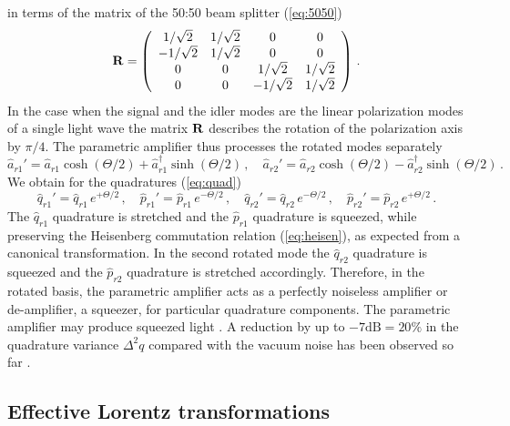 \documentclass[12pt,amsmath,amssymb]{article}
\def\underline#1{{\bf #1}}
\numberwithin{equation}{section}
\begin{document}
in terms of the matrix of the 50:50 beam splitter (\ref{eq:5050})
\begin{equation}
\underline{R} = \left(
    \begin{array}{cccc}
     {1}/{\sqrt{2}}&{1}/{\sqrt{2}}&0&0\\
     -{1}/{\sqrt{2}}&{1}/{\sqrt{2}}&0&0\\
     0&0&{1}/{\sqrt{2}}&{1}/{\sqrt{2}}\\
     0&0&-{1}/{\sqrt{2}}&{1}/{\sqrt{2}}
    \end{array}
\right) \,.
\end{equation}
In the case when the signal and the idler modes are the linear
polarization modes of a single light wave the matrix
$\underline{R}$ describes the rotation of the polarization axis
by $\pi/4$. The parametric amplifier thus processes the rotated modes
separately
\begin{equation}
\hat{a}_{r1}' =
\hat{a}_{r1}\cosh(\Theta/2)+\hat{a}_{r1}^\dagger\sinh(\Theta/2)
\,,\quad \hat{a}_{r2}' =
\hat{a}_{r2}\cosh(\Theta/2)-\hat{a}_{r2}^\dagger\sinh(\Theta/2)
\,.
\end{equation}
We obtain for the quadratures (\ref{eq:quad})
\begin{equation}
\hat{q}_{r1}'=\hat{q}_{r1}\,e^{+\Theta/2}\,,\quad
\hat{p}_{r1}'=\hat{p}_{r1}\,e^{-\Theta/2}\,,\quad
\hat{q}_{r2}'=\hat{q}_{r2}\,e^{-\Theta/2}\,,\quad
\hat{p}_{r2}'=\hat{p}_{r2}\,e^{+\Theta/2}\,.
\label{eq:quadsqueeze}
\end{equation}
The $\hat{q}_{r1}$ quadrature is stretched and the $\hat{p}_{r1}$
quadrature is squeezed, while preserving the Heisenberg
commutation relation (\ref{eq:heisen}), as expected from a
canonical transformation. In the second rotated mode the
$\hat{q}_{r2}$ quadrature is squeezed and the $\hat{p}_{r2}$
quadrature is stretched accordingly. Therefore, in the rotated
basis, the parametric amplifier acts as a perfectly noiseless
amplifier or de-amplifier, a squeezer, for particular quadrature
components. The parametric amplifier may produce squeezed light
\cite{Breitenbach,Leonhardt,LoudonKnight}.
A reduction by up to $-7\mbox{dB}=20\%$
in the quadrature variance $\Delta^2 q$
compared with the vacuum noise has been
observed so far \cite{Lam}.

\subsection{Effective Lorentz transformations}
\end{document}
